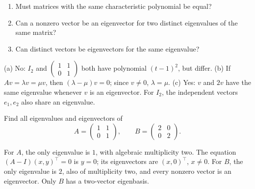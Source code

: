 \begin{problem}\label{ex:08:uniqueness}
\begin{enumerate}
\item Must matrices with the same characteristic polynomial be equal?
\item Can a nonzero vector be an eigenvector for two distinct eigenvalues
of the same matrix?
\item Can distinct vectors be eigenvectors for the same eigenvalue?
\end{enumerate}
\end{problem}
\begin{solution}
(a) No: \(I_2\) and \(\begin{pmatrix}1&1\\0&1\end{pmatrix}\) both have
polynomial \((t-1)^2\), but differ.
(b) If \(Av=\lambda v=\mu v\), then \((\lambda-\mu)v=0\); since \(v\ne0\),
\(\lambda=\mu\).
(c) Yes: \(v\) and \(2v\) have the same eigenvalue whenever \(v\) is an
eigenvector. For \(I_2\), the independent vectors \(e_1,e_2\) also share
an eigenvalue.
\end{solution}

\begin{problem}\label{ex:08:shear}
Find all eigenvalues and eigenvectors of
\[
 A=\begin{pmatrix}1&1\\0&1\end{pmatrix},\qquad
 B=\begin{pmatrix}2&0\\0&2\end{pmatrix}.
\]
\end{problem}
\begin{solution}
For \(A\), the only eigenvalue is \(1\), with algebraic multiplicity two.
The equation \((A-I)(x,y)^\top=0\) is \(y=0\); its eigenvectors are
\((x,0)^\top\), \(x\ne0\). For \(B\), the only eigenvalue is \(2\),
also of multiplicity two, and every nonzero vector is an eigenvector.
Only \(B\) has a two-vector eigenbasis.
\end{solution}

